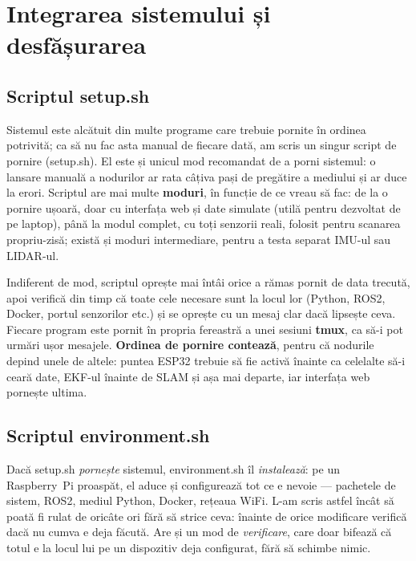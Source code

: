 \documentclass[a4paper,12pt,twoside,openany]{report}
\renewcommand{\texttt}[1]{\textnormal{#1}}
\begin{document}
\clearpage

\chapter{Integrarea sistemului și desfășurarea}
\label{cap:deploy}

\section{Scriptul setup.sh}
\label{sec:setup-sh}

Sistemul este alcătuit din multe programe care trebuie pornite în ordinea
potrivită; ca să nu fac asta manual de fiecare dată, am scris un singur script
de pornire (\texttt{setup.sh}). El este și unicul mod recomandat de a porni
sistemul: o lansare manuală a nodurilor ar rata câțiva pași de pregătire a
mediului și ar duce la erori. Scriptul are mai multe \textbf{moduri}, în
funcție de ce vreau să fac: de la o pornire ușoară, doar cu interfața web și
date simulate (utilă pentru dezvoltat de pe laptop), până la modul complet, cu
toți senzorii reali, folosit pentru scanarea propriu-zisă; există și moduri
intermediare, pentru a testa separat IMU-ul sau LIDAR-ul.

Indiferent de mod, scriptul oprește mai întâi orice a rămas pornit de
data trecută, apoi verifică din timp că toate cele necesare sunt la locul lor
(Python, ROS2, Docker, portul senzorilor etc.) și se oprește cu un mesaj clar
dacă lipsește ceva. Fiecare program este pornit în propria fereastră a unei
sesiuni \textbf{tmux}, ca să-i pot urmări ușor mesajele. \textbf{Ordinea de
pornire contează}, pentru că nodurile depind unele de altele: puntea ESP32
trebuie să fie activă înainte ca celelalte să-i ceară date, EKF-ul înainte de
SLAM și așa mai departe, iar interfața web pornește ultima.

\section{Scriptul environment.sh}
\label{sec:environment-sh}

Dacă \texttt{setup.sh} \emph{pornește} sistemul, \texttt{environment.sh} îl
\emph{instalează}: pe un Raspberry~Pi proaspăt, el aduce și configurează tot ce
e nevoie — pachetele de sistem, ROS2, mediul Python, Docker, rețeaua WiFi. L-am
scris astfel încât să poată fi rulat de oricâte ori fără să strice ceva: înainte
de orice modificare verifică dacă nu cumva e deja făcută. Are și un mod de
\emph{verificare}, care doar bifează că totul e la locul lui pe un dispozitiv
deja configurat, fără să schimbe nimic.
\end{document}
